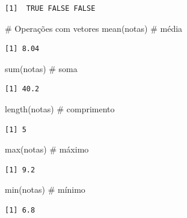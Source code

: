 \documentclass[
  letterpaper,
]{scrbook}
\newenvironment{Shaded}{\begin{snugshade}}{\end{snugshade}}
\newcommand{\CommentTok}[1]{\textcolor[rgb]{0.37,0.37,0.37}{#1}}
\newcommand{\FunctionTok}[1]{\textcolor[rgb]{0.28,0.35,0.67}{#1}}
\newcommand{\NormalTok}[1]{\textcolor[rgb]{0.00,0.23,0.31}{#1}}
\begin{document}
\begin{verbatim}
[1]  TRUE FALSE FALSE
\end{verbatim}

\begin{Shaded}
\begin{Highlighting}[]
\CommentTok{\# Operações com vetores}
\FunctionTok{mean}\NormalTok{(notas)       }\CommentTok{\# média}
\end{Highlighting}
\end{Shaded}

\begin{verbatim}
[1] 8.04
\end{verbatim}

\begin{Shaded}
\begin{Highlighting}[]
\FunctionTok{sum}\NormalTok{(notas)        }\CommentTok{\# soma}
\end{Highlighting}
\end{Shaded}

\begin{verbatim}
[1] 40.2
\end{verbatim}

\begin{Shaded}
\begin{Highlighting}[]
\FunctionTok{length}\NormalTok{(notas)     }\CommentTok{\# comprimento}
\end{Highlighting}
\end{Shaded}

\begin{verbatim}
[1] 5
\end{verbatim}

\begin{Shaded}
\begin{Highlighting}[]
\FunctionTok{max}\NormalTok{(notas)        }\CommentTok{\# máximo}
\end{Highlighting}
\end{Shaded}

\begin{verbatim}
[1] 9.2
\end{verbatim}

\begin{Shaded}
\begin{Highlighting}[]
\FunctionTok{min}\NormalTok{(notas)        }\CommentTok{\# mínimo}
\end{Highlighting}
\end{Shaded}

\begin{verbatim}
[1] 6.8
\end{verbatim}
\end{document}
